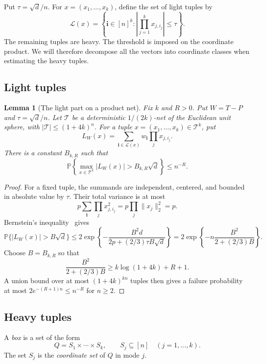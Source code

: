 \documentclass[10pt,a4paper]{amsart}
\numberwithin{equation}{section}
\newtheorem{lemma}[theorem]{Lemma}
\newcommand{\Pp}{\mathbb P}
\begin{document}
Put $\tau=\sqrt d/n$. For $x=(x_1,\ldots,x_k)$, define the set of light tuples by
\begin{equation}\label{eq:light-set}
 \mathcal L(x)
 =\left\{\mathbf i\in[n]^k:
             \left|\prod_{j=1}^k x_{j,i_j}\right|\le\tau\right\}.
\end{equation}
The remaining tuples are heavy. The threshold is imposed on the
coordinate product. We will therefore
decompose all the vectors into coordinate classes when estimating
the heavy tuples.

\subsection{Light tuples}\label{sec:light}

\begin{lemma}[The light part on a product net]\label{lem:light}
Fix $k$ and $R>0$. Put $W=T-P$ and $\tau=\sqrt d/n$.
Let $\mathcal T$ be a deterministic $1/(2k)$-net of the Euclidean unit sphere,
with $|\mathcal T|\le(1+4k)^n$. For a tuple
$x=(x_1,\ldots,x_k)\in\mathcal T^k$, put
\[
 L_W(x)=\sum_{\mathbf i\in\mathcal L(x)}
           w_{\mathbf i}\prod_jx_{j,i_j}.
\]
There is a constant $B_{k,R}$ such that
\[
 \Pp\left\{\max_{x\in\mathcal T^k}|L_W(x)|>
                         B_{k,R}\sqrt d\right\}\le n^{-R}.
\]
\end{lemma}
\begin{proof}
For a fixed tuple, the summands are independent, centered, and bounded
in absolute value by $\tau$. Their total variance is at most
\[
 p\sum_{\mathbf i}\prod_jx_{j,i_j}^2
       =p\prod_j\|x_j\|_2^2=p.
\]
Bernstein's inequality~\cite[Theorem~2.9.5]{V26} gives
\[
 \Pp\{|L_W(x)|>B\sqrt d\}
 \le2\exp\left\{-\frac{B^2d}{2p+(2/3)\tau B\sqrt d}\right\}
 =2\exp\left\{-n\frac{B^2}{2+(2/3)B}\right\}.
\]
Choose $B=B_{k,R}$ so that
\[
 \frac{B^2}{2+(2/3)B}\ge k\log(1+4k)+R+1.
\]
A union bound over at most $(1+4k)^{kn}$ tuples then gives a failure
probability at most $2e^{-(R+1)n}\le n^{-R}$ for $n\ge2$.
\end{proof}


\subsection{Heavy tuples}\label{sec:heavy}

A \emph{box} is a set of the form
\[
 Q=S_1\times\cdots\times S_k,
 \qquad S_j\subseteq[n]\quad(j=1,\ldots,k).
\]
The set $S_j$ is the \emph{coordinate set} of $Q$ in mode $j$.
\end{document}
